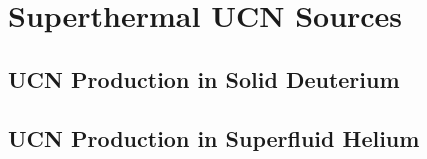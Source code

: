 \chapter{Superthermal UCN Sources}

\section{UCN Production in Solid Deuterium}

\section{UCN Production in Superfluid Helium}
